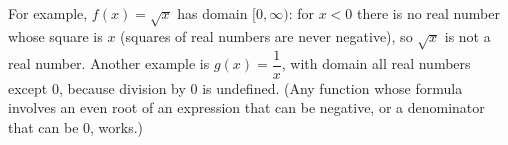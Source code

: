 For example, $f(x)=\sqrt x$ has domain $\boxed{[0,\infty)}$: for $x<0$ there is no real number whose square is $x$ (squares of real numbers are never negative), so $\sqrt x$ is not a real number. Another example is $g(x)=\dfrac1x$, with domain all real numbers except $0$, because division by $0$ is undefined. (Any function whose formula involves an even root of an expression that can be negative, or a denominator that can be $0$, works.)
